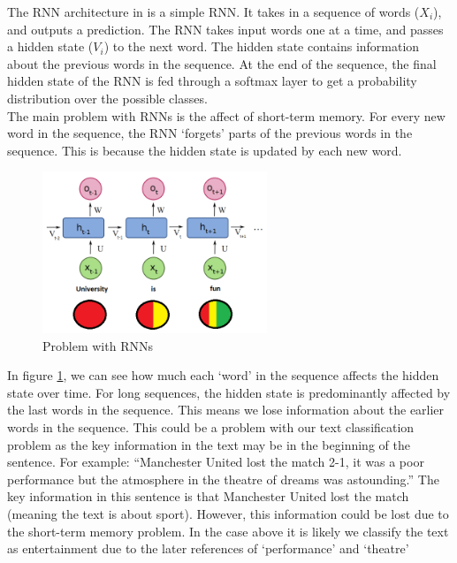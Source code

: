 The RNN architecture in  is a simple RNN. It takes in a sequence of words ($X_i$), and outputs a prediction. The RNN takes input
words one at a time, and passes a hidden state ($V_i$) to the next word. The hidden state contains information about the previous words in the
sequence. At the end of the sequence, the final hidden state of the RNN is fed through a softmax layer to get a probability distribution over the
possible classes.\\
The main problem with RNNs is the affect of short-term memory. For every new word in the sequence, the RNN `forgets' parts of the
previous words in the sequence. This is because the hidden state is updated by each new word.
\begin{figure}
    \centering
    \includegraphics[width=0.6\textwidth]{../images/shortterm-problem.png}
    \caption{Problem with RNNs}
    \label{fig:stm}
\end{figure}

In figure \ref{fig:stm}, we can see how much each `word' in the sequence affects the hidden state over time. For long sequences,
the hidden state is predominantly affected by the last words in the sequence. This means we lose information about the earlier words
in the sequence. This could be a problem with our text classification problem as the key information in the text may be in the
beginning of the sentence. For example: ``Manchester United lost the match 2-1, it was a poor performance but the atmosphere in the
theatre of dreams was astounding.'' The key information in this sentence is that Manchester United lost the match (meaning the text
is about sport). However, this information could be lost due to the short-term memory problem. In the case above it is likely
we classify the text as entertainment due to the later references of `performance' and `theatre'\\
